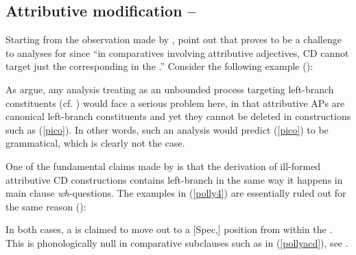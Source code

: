 \subsection{Attributive modification -- \citet{kennedymerchant2000}} \label{sec:4attributivemodification}
Starting from the observation made by \citet{pinkham1982diss, pinkham1985}, \citet[91--92]{kennedymerchant2000} point out that  proves to be a challenge to  analyses for  since ``in comparatives involving attributive adjectives, CD cannot target just the corresponding  in the .'' Consider the following example (\citealt[92, ex. 7a]{kennedymerchant2000}):

 \label{pico}
\z

As \citet[92]{kennedymerchant2000} argue, any analysis treating  as an unbounded  process targeting left-branch constituents (cf. \citealt{bresnan1975}) would face a serious problem here, in that attributive APs are canonical left-branch constituents and yet they cannot be deleted in constructions such as (\ref{pico}). In other words, such an analysis would predict (\ref{pico}) to be grammatical, which is clearly not the case.

One of the fundamental claims made by \citet[103]{kennedymerchant2000} is that the derivation of ill-formed attributive CD constructions contains left-branch  in the same way it happens in main clause \textit{wh}-questions. The examples in (\ref{polly4}) are essentially ruled out for the same reason (\citealt[103, exx. 25 and 26]{kennedymerchant2000}):

\ea \label{polly4}
 \label{pollyacd}
 \label{pollyint}
\z
\z

In both cases, a  is claimed to move out to a [Spec,] position from within the . This  is phonologically null in comparative subclauses such as in (\ref{pollyacd}), see \citet[102--103]{kennedymerchant2000}.

